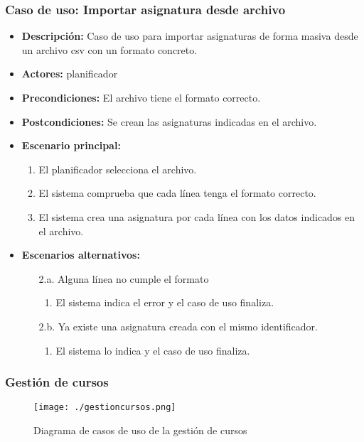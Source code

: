 \subsubsection*{Caso de uso: Importar asignatura desde archivo}
\begin{itemize}
\item{\bf Descripción:} Caso de uso para importar asignaturas de forma masiva desde un archivo csv con un formato concreto.
\item{\bf Actores:} planificador
\item{\bf Precondiciones:} El archivo tiene el formato correcto.
\item{\bf Postcondiciones:} Se crean las asignaturas indicadas en el archivo.
\item{\bf Escenario principal:}
	\begin{enumerate}
	\item El planificador selecciona el archivo.
	\item El sistema comprueba que cada línea tenga el formato correcto.
	\item El sistema crea una asignatura por cada línea con los datos indicados en el archivo.
	\end{enumerate}
\item{\bf Escenarios alternativos:}
	\begin{itemize}
		\item[2.a.] Alguna línea no cumple el formato
		\begin{enumerate}
			\item El sistema indica el error y el caso de uso finaliza.
		\end{enumerate}
		\item[2.b.] Ya existe una asignatura creada con el mismo identificador.
		\begin{enumerate}
			\item El sistema lo indica y el caso de uso finaliza.
		\end{enumerate}
	\end{itemize}
\end{itemize}


\subsubsection{Gestión de cursos}
\begin{figure}[H] 
  \label{gestion-cursos} 
	\begin{center}
    \texttt{[image: ./gestioncursos.png]}
  \end{center}
\caption{Diagrama de casos de uso de la gestión de cursos}
\end{figure}

